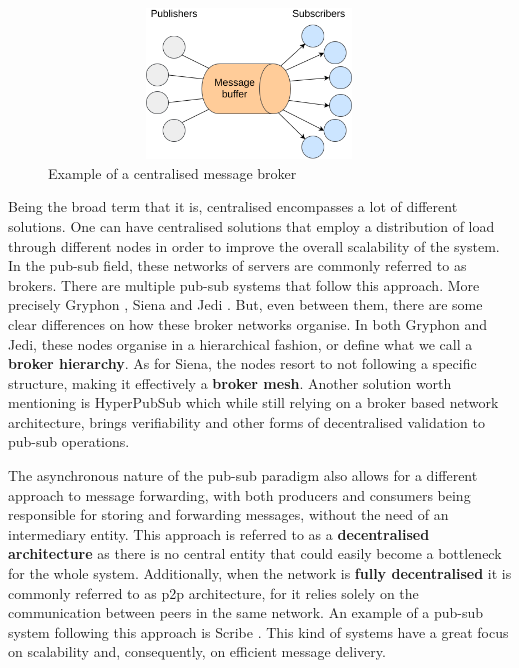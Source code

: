 \begin{figure}[hb!]
  \centering
  \includegraphics[max height=4cm,max width=0.95\textwidth]{img/centralised-topology.png}
  \caption{Example of a centralised message broker}
  \label{fig:centralised-topology}
\end{figure}

Being the broad term that it is, centralised encompasses a lot of different
solutions.  One can have centralised solutions that employ a distribution of
load through different nodes in order to improve the overall scalability of the
system. In the pub-sub field, these networks of servers are commonly referred
to as brokers. There are multiple pub-sub systems that follow this approach.
More precisely Gryphon \cite{Strom1998}, Siena \cite{Carzaniga2003} and Jedi
\cite{Cugola2001}. But, even between them, there are some clear differences on
how these broker networks organise. In both Gryphon and Jedi, these nodes
organise in a hierarchical fashion, or define what we call a \textbf{broker
hierarchy}. As for Siena, the nodes resort to not following a specific
structure, making it effectively a \textbf{broker mesh}. Another solution worth mentioning is HyperPubSub \cite{Zupan2017} which while still relying on a
broker based network architecture, brings verifiability and other forms of
decentralised validation to pub-sub operations.

The asynchronous nature of the pub-sub paradigm also allows for a different
approach to message forwarding, with both producers and consumers being
responsible for storing and forwarding messages, without the need of an
intermediary entity. This approach is referred to as a \textbf{decentralised
architecture} as there is no central entity that could easily become a
bottleneck for the whole system. Additionally, when the network is
\textbf{fully decentralised} it is commonly referred to as \acrfull{p2p}
architecture, for it relies solely on the communication between peers in the
same network.  An example of a pub-sub system following this approach is Scribe
\cite{Castro2002}.  This kind of systems have a great focus on scalability and,
consequently, on efficient message delivery.

